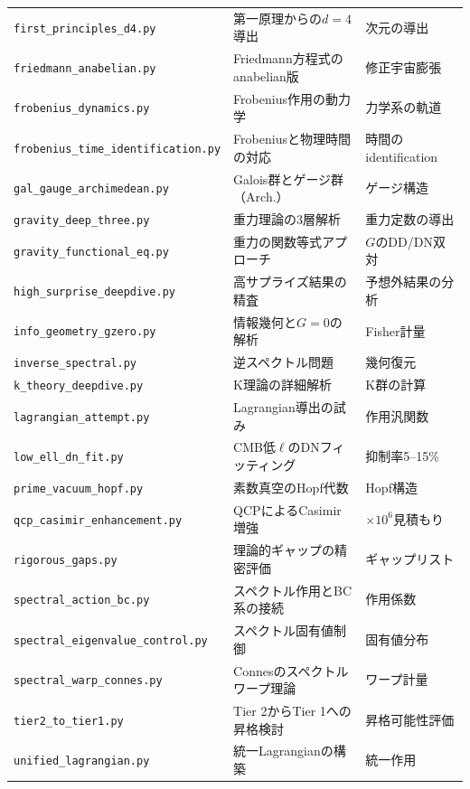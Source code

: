 \begin{longtable}{@{}p{5.5cm}p{5cm}p{4cm}@{}}
\texttt{first\_principles\_d4.py} & 第一原理からの$d=4$導出 & 次元の導出 \\
\texttt{friedmann\_anabelian.py} & Friedmann方程式のanabelian版 & 修正宇宙膨張 \\
\texttt{frobenius\_dynamics.py} & Frobenius作用の動力学 & 力学系の軌道 \\
\texttt{frobenius\_time\allowbreak \_identification.py} & Frobeniusと物理時間の対応 & 時間のidentification \\
\texttt{gal\_gauge\_archimedean.py} & Galois群とゲージ群（Arch.） & ゲージ構造 \\
\texttt{gravity\_deep\_three.py} & 重力理論の3層解析 & 重力定数の導出 \\
\texttt{gravity\_functional\_eq.py} & 重力の関数等式アプローチ & $G$のDD/DN双対 \\
\texttt{high\_surprise\_deepdive.py} & 高サプライズ結果の精査 & 予想外結果の分析 \\
\texttt{info\_geometry\_gzero.py} & 情報幾何と$G=0$の解析 & Fisher計量 \\
\texttt{inverse\_spectral.py} & 逆スペクトル問題 & 幾何復元 \\
\texttt{k\_theory\_deepdive.py} & K理論の詳細解析 & K群の計算 \\
\texttt{lagrangian\_attempt.py} & Lagrangian導出の試み & 作用汎関数 \\
\texttt{low\_ell\_dn\_fit.py} & CMB低$\ell$のDNフィッティング & 抑制率5--15\% \\
\texttt{prime\_vacuum\_hopf.py} & 素数真空のHopf代数 & Hopf構造 \\
\texttt{qcp\_casimir\allowbreak \_enhancement.py} & QCPによるCasimir増強 & $\times 10^6$見積もり \\
\texttt{rigorous\_gaps.py} & 理論的ギャップの精密評価 & ギャップリスト \\
\texttt{spectral\_action\_bc.py} & スペクトル作用とBC系の接続 & 作用係数 \\
\texttt{spectral\_eigenvalue\allowbreak \_control.py} & スペクトル固有値制御 & 固有値分布 \\
\texttt{spectral\_warp\_connes.py} & Connesのスペクトルワープ理論 & ワープ計量 \\
\texttt{tier2\_to\_tier1.py} & Tier 2からTier 1への昇格検討 & 昇格可能性評価 \\
\texttt{unified\_lagrangian.py} & 統一Lagrangianの構築 & 統一作用 \\
\bottomrule
\end{longtable}

